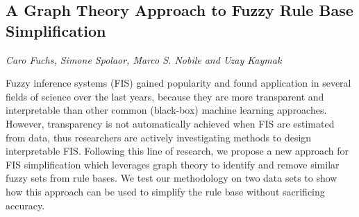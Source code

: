 \documentclass[../booklet.tex]{subfiles}
\begin{document}
\subsection[A Graph Theory Approach to Fuzzy Rule Base Simplification. {\it Caro Fuchs, Simone Spolaor, Marco S. Nobile and Uzay Kaymak}]{A Graph Theory Approach to Fuzzy Rule Base Simplification}
   

\begin{center}
  {\it Caro Fuchs, Simone Spolaor, Marco S. Nobile and Uzay Kaymak}
\end{center}



Fuzzy inference systems (FIS) gained popularity and found application in several fields of science over the last years, because they are more transparent and interpretable than other common (black-box) machine learning approaches.
However, transparency is not automatically achieved when FIS are estimated from data, thus researchers are actively investigating methods to design interpretable FIS.
Following this line of research, we propose a new approach for FIS simplification which leverages graph theory to identify and remove similar fuzzy sets from rule bases.
We test our methodology on two data sets to show how this approach can be used to simplify the rule base without sacrificing accuracy.

\end{document}
